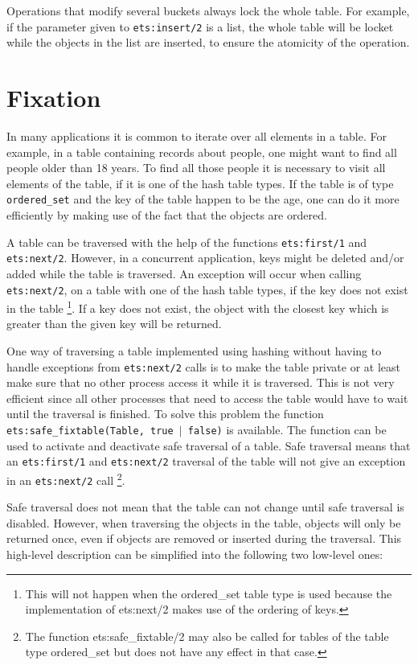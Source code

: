 \documentclass[aps,pre,preprint,nofootinbib]{revtex4}
\begin{document}
Operations that modify several buckets always lock the whole table.
For example, if the parameter given to \verb|ets:insert/2| is a list, the whole table will be locket while the objects in the list are inserted, to ensure the atomicity of the operation.

\section{Fixation}
\label{sec:fixation}

In many applications it is common to iterate over all elements in a table.
For example, in a table containing records about people, one might want to find all people older than 18 years.
To find all those people it is necessary to visit all elements of the table, if it is one of the hash table types.
If the table is of type \verb|ordered_set| and the key of the table happen to be the age, one can do it more efficiently by making use of the fact that the objects are ordered.

A table can be traversed with the help of the functions \verb|ets:first/1| and \verb|ets:next/2|.
However, in a concurrent application, keys might be deleted and/or added while the table is traversed.
An exception will occur when calling \verb|ets:next/2|, on a table with one of the hash table types, if the key does not exist in the table
\footnote{This will not happen when the ordered\_set table type is used because the implementation of  ets:next/2 makes use of the ordering of keys.}.
If a key does not exist, the object with the closest key which is greater than the given key will be returned.

One way of traversing a table implemented using hashing without having to handle exceptions from \verb|ets:next/2| calls is to make the table private or at least make sure that no other process access it while it is traversed.
This is not very efficient since all other processes that need to access the table would have to wait until the traversal is finished.
To solve this problem the function \texttt{ets:safe\_fixtable(Table, true $|$ false)} is available.
The function can be used to activate and deactivate safe traversal of a table. 
Safe traversal means that an \verb|ets:first/1| and \verb|ets:next/2| traversal of the table will not give an exception in an \verb|ets:next/2| call
\footnote{The function ets:safe\_fixtable/2 may also be called for tables of the table type ordered\_set but does not have any effect in that case.}.

Safe traversal does not mean that the table can not change until safe traversal is disabled.
However, when traversing the objects in the table, objects will only be returned once, even if objects are removed or inserted during the traversal.
This high-level description can be simplified into the following two low-level ones:
\end{document}
